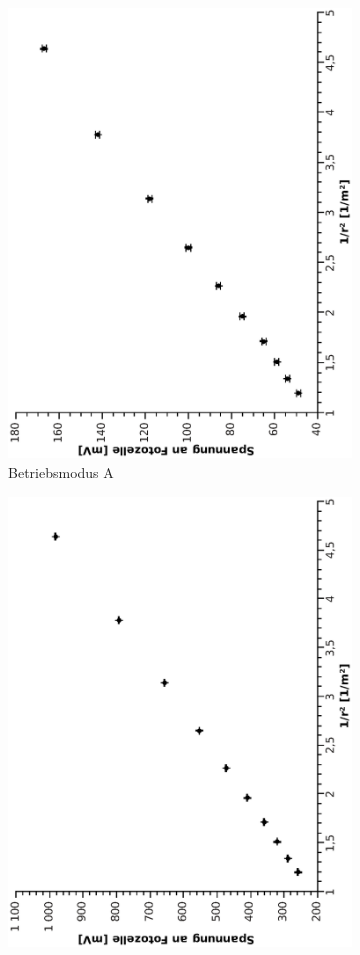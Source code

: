 \documentclass[12pt,a4paper,twopage]{article}
\begin{document}


\begin{figure}[H]
\centering
\begin{subfigure}{0.48\linewidth}
\includegraphics[width=0.75\linewidth, angle=-90]{niedrigetemp.eps}
\caption{ \label{figLowTemp} Betriebsmodus A}
\end{subfigure}
\begin{subfigure}{0.48\linewidth}
\includegraphics[width=0.75\linewidth, angle=-90]{hohetemp.eps}

\end{subfigure}
\end{figure}
\end{document}
